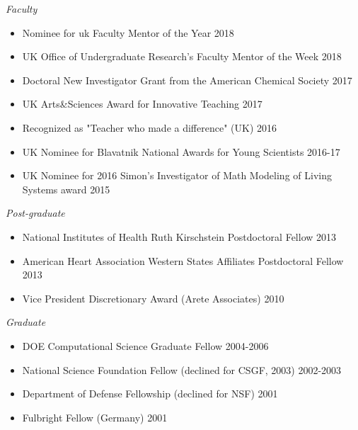 \vspace{8pt} %



{\sl Faculty}
\begin{itemize} \itemsep -12pt %
\item  Nominee for \acrfull{uk} Faculty Mentor of the Year \hfill 2018 \\
\item  UK Office of Undergraduate Research's Faculty Mentor of the Week \hfill 2018 \\
\item Doctoral New Investigator Grant from the American Chemical Society \hfill 2017\\
\item UK Arts\&Sciences Award for Innovative Teaching \hfill 2017\\
\item Recognized as "Teacher who made a difference" (UK) \hfill 2016\\
\item UK Nominee for Blavatnik National Awards for Young Scientists \hfill 2016-17\\
\item UK Nominee for 2016 Simon's Investigator of Math
Modeling of Living Systems award \hfill 2015 \\
\end{itemize}

{\sl Post-graduate}
\begin{itemize} \itemsep -12pt %
\item National Institutes of Health Ruth Kirschstein Postdoctoral Fellow  \hfill 2013 \\
\item American Heart Association Western States Affiliates Postdoctoral
Fellow \hfill 2013 \\
\item Vice President Discretionary Award (Arete Associates)	\hfill 2010 \\
\end{itemize}

{\sl Graduate }
\begin{itemize} \itemsep -12pt %
\item DOE Computational Science Graduate Fellow	\hfill 2004-2006  \\
\item National Science Foundation Fellow (declined for CSGF, 2003)	\hfill 2002-2003 \\
\item Department of Defense Fellowship (declined for NSF)  \hfill 2001 \\
\item Fulbright Fellow (Germany)	\hfill 2001 \\
\end{itemize}

